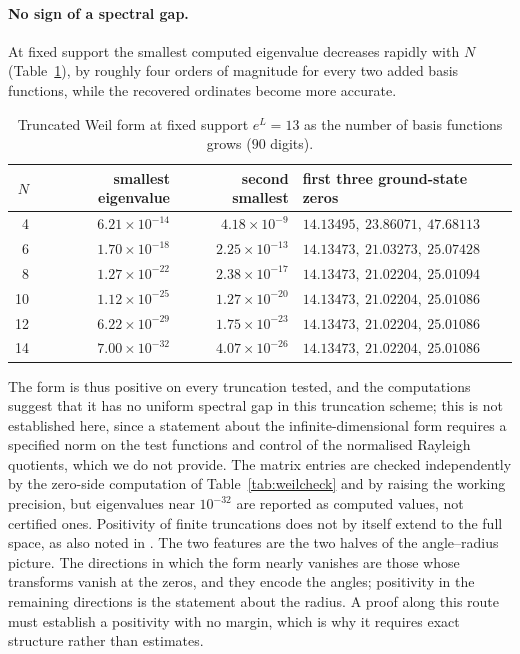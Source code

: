 \documentclass[11pt,a4paper]{article}
\theoremstyle{definition}\newtheorem{definition}[proposition]{Definition}
\theoremstyle{remark}\newtheorem{remark}[proposition]{Remark}
\begin{document}
\paragraph{No sign of a spectral gap.} At fixed support the smallest computed eigenvalue decreases rapidly with $N$ (Table~\ref{tab:weilscan}), by roughly four orders of magnitude for every two added basis functions, while the recovered ordinates become more accurate.

\begin{table}[ht]
\centering\small
\begin{tabular}{rrrl}
\toprule
$N$ & smallest eigenvalue & second smallest & first three ground-state zeros\\
\midrule
4 & $6.21\times10^{-14}$ & $4.18\times10^{-9}$ & $14.13495,\ 23.86071,\ 47.68113$\\
6 & $1.70\times10^{-18}$ & $2.25\times10^{-13}$ & $14.13473,\ 21.03273,\ 25.07428$\\
8 & $1.27\times10^{-22}$ & $2.38\times10^{-17}$ & $14.13473,\ 21.02204,\ 25.01094$\\
10 & $1.12\times10^{-25}$ & $1.27\times10^{-20}$ & $14.13473,\ 21.02204,\ 25.01086$\\
12 & $6.22\times10^{-29}$ & $1.75\times10^{-23}$ & $14.13473,\ 21.02204,\ 25.01086$\\
14 & $7.00\times10^{-32}$ & $4.07\times10^{-26}$ & $14.13473,\ 21.02204,\ 25.01086$\\
\bottomrule
\end{tabular}
\caption{Truncated Weil form at fixed support $e^L=13$ as the number of basis functions grows ($90$ digits).}\label{tab:weilscan}
\end{table}

The form is thus positive on every truncation tested, and the computations suggest that it has no uniform spectral gap in this truncation scheme; this is not established here, since a statement about the infinite-dimensional form requires a specified norm on the test functions and control of the normalised Rayleigh quotients, which we do not provide. The matrix entries are checked independently by the zero-side computation of Table~\ref{tab:weilcheck} and by raising the working precision, but eigenvalues near $10^{-32}$ are reported as computed values, not certified ones. Positivity of finite truncations does not by itself extend to the full space, as also noted in \cite{Groskin2026}. The two features are the two halves of the angle--radius picture. The directions in which the form nearly vanishes are those whose transforms vanish at the zeros, and they encode the angles; positivity in the remaining directions is the statement about the radius. A proof along this route must establish a positivity with no margin, which is why it requires exact structure rather than estimates.
\end{document}
